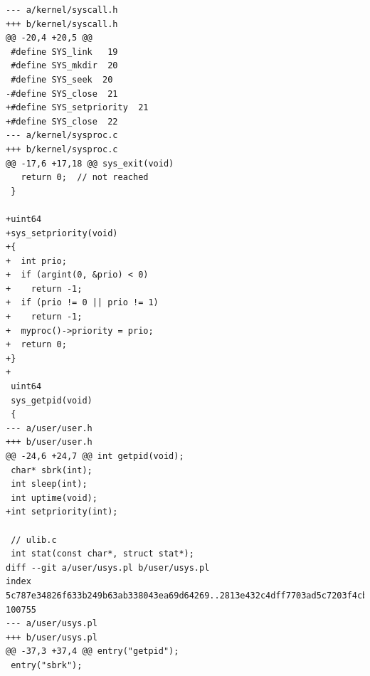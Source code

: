 \begin{appendices}
\begin{verbatim}
--- a/kernel/syscall.h
+++ b/kernel/syscall.h
@@ -20,4 +20,5 @@
 #define SYS_link   19
 #define SYS_mkdir  20
 #define SYS_seek  20
-#define SYS_close  21
+#define SYS_setpriority  21
+#define SYS_close  22
--- a/kernel/sysproc.c
+++ b/kernel/sysproc.c
@@ -17,6 +17,18 @@ sys_exit(void)
   return 0;  // not reached
 }
 
+uint64
+sys_setpriority(void)
+{
+  int prio;
+  if (argint(0, &prio) < 0)
+    return -1;
+  if (prio != 0 || prio != 1)
+    return -1;
+  myproc()->priority = prio;
+  return 0;
+}
+
 uint64
 sys_getpid(void)
 {
--- a/user/user.h
+++ b/user/user.h
@@ -24,6 +24,7 @@ int getpid(void);
 char* sbrk(int);
 int sleep(int);
 int uptime(void);
+int setpriority(int);
 
 // ulib.c
 int stat(const char*, struct stat*);
diff --git a/user/usys.pl b/user/usys.pl
index 5c787e34826f633b249b63ab338043ea69d64269..2813e432c4dff7703ad5c7203f4cbebb7bbce0e7 100755
--- a/user/usys.pl
+++ b/user/usys.pl
@@ -37,3 +37,4 @@ entry("getpid");
 entry("sbrk");
\end{verbatim}

\end{appendices}

